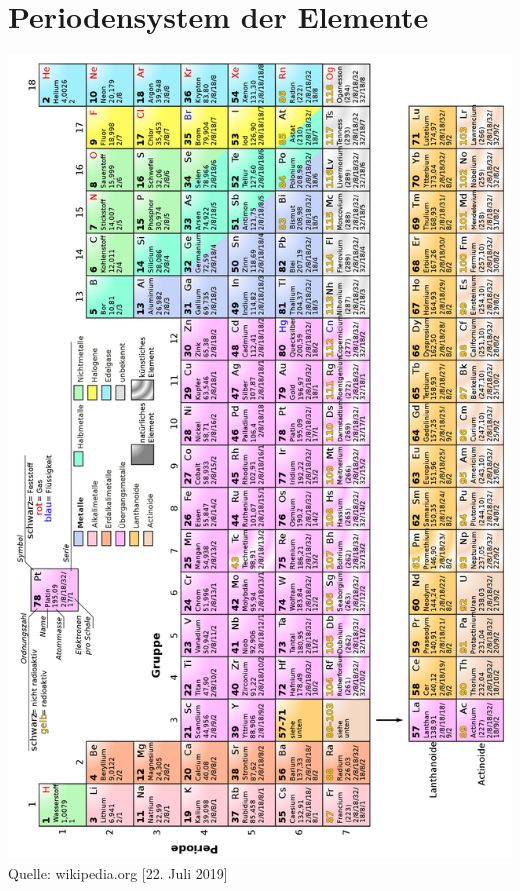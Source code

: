 
\newpage
\section{Periodensystem der Elemente}
	\begin{minipage}[t]{18cm}
		\begin{center}
			\includegraphics[width=15cm]{./bilder/Periodensystem.png}
			\newline
			Quelle: wikipedia.org [22. Juli 2019]
		\end{center}
	\end{minipage}
	